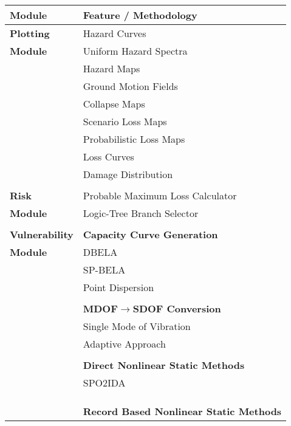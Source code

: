 \begin{table}[!htbp]
\centering
\begin{tabular}{|l|l|} \hline
\textbf{Module}     & \textbf{Feature / Methodology} \\ \hline
\textbf{Plotting}   & Hazard Curves \\
\textbf{Module}     & Uniform Hazard Spectra \\
                    & Hazard Maps \\
                    & Ground Motion Fields \\
                    & Collapse Maps \\
                    & Scenario Loss Maps \\
                    & Probabilistic Loss Maps \\
                    & Loss Curves \\
                    & Damage Distribution \\
                    & \\ \hline
\textbf{Risk}       & Probable Maximum Loss Calculator \\
\textbf{Module}     & Logic-Tree Branch Selector \\
                    & \\ \hline
\textbf{Vulnerability} & \textbf{Capacity Curve Generation} \\
\textbf{Module}        & DBELA \\
                    & SP-BELA \\
                    & Point Dispersion \\
                    & \\
                    & \textbf{MDOF$\to$SDOF Conversion} \\
                    & Single Mode of Vibration \\
                    & Adaptive Approach \\
                    & \\
                    & \textbf{Direct Nonlinear Static Methods} \\
                    & SPO2IDA \citep{VamvatsikosCornell2005} \\
                    & \citet{DolsekFajfar2004} \\
                    & \citet{RuizGarciaMiranda2007} \\
                    & \\
                    & \textbf{Record Based Nonlinear Static Methods} \\

\end{tabular}
\end{table}
